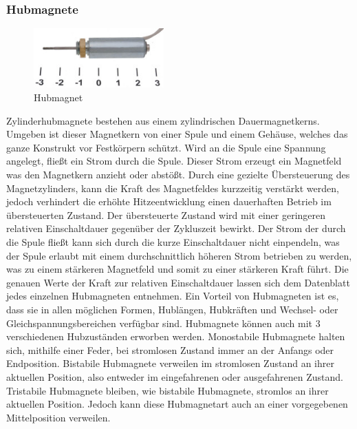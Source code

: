 \subsubsection{Hubmagnete}
\begin{figure}[H] 
\begin{center}

\includegraphics[width=5cm]{Bilder/Bauteile/Hubmagnet}
\caption{Hubmagnet}
\label{Hubmagnet}

\end{center}
\end{figure}
Zylinderhubmagnete bestehen aus einem zylindrischen Dauermagnetkerns. Umgeben ist dieser Magnetkern von einer Spule und einem Gehäuse, welches das ganze Konstrukt vor Festkörpern schützt. Wird an die Spule eine Spannung angelegt, fließt ein Strom durch die Spule. Dieser Strom erzeugt ein Magnetfeld was den Magnetkern anzieht oder abstößt. Durch eine gezielte Übersteuerung des Magnetzylinders, kann die Kraft des Magnetfeldes kurzzeitig verstärkt werden, jedoch verhindert die erhöhte Hitzeentwicklung einen dauerhaften Betrieb im übersteuerten Zustand. Der übersteuerte Zustand wird mit einer geringeren relativen Einschaltdauer gegenüber der Zykluszeit bewirkt. Der Strom der durch die Spule fließt kann sich durch die kurze Einschaltdauer nicht einpendeln, was der Spule erlaubt mit einem durchschnittlich höheren Strom betrieben zu werden, was zu einem stärkeren Magnetfeld und somit zu einer stärkeren Kraft führt. Die genauen Werte der Kraft zur relativen Einschaltdauer lassen sich dem Datenblatt jedes einzelnen Hubmagneten entnehmen. Ein Vorteil von Hubmagneten ist es, dass sie in allen möglichen Formen, Hublängen, Hubkräften und Wechsel- oder Gleichspannungsbereichen verfügbar sind. Hubmagnete können auch mit 3 verschiedenen Hubzuständen erworben werden. Monostabile Hubmagnete halten sich, mithilfe einer Feder, bei stromlosen Zustand immer an der Anfangs oder Endposition. Bistabile Hubmagnete verweilen im stromlosen Zustand an ihrer aktuellen Position, also entweder im eingefahrenen oder ausgefahrenen Zustand. Tristabile Hubmagnete bleiben, wie bistabile Hubmagnete, stromlos an ihrer aktuellen Position. Jedoch kann diese Hubmagnetart auch an einer vorgegebenen Mittelposition verweilen.

